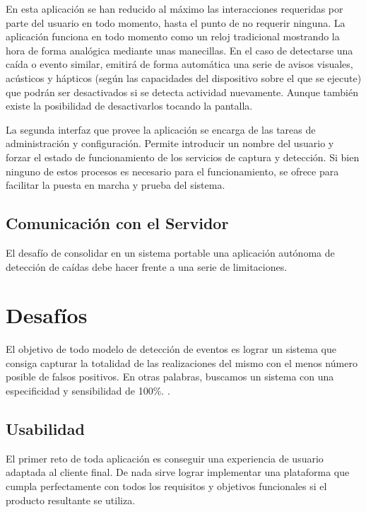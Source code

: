 En esta aplicación se han reducido al máximo las interacciones requeridas por parte del usuario en todo momento, hasta el punto de no requerir ninguna. La aplicación funciona en todo momento como un reloj tradicional mostrando la hora de forma analógica mediante unas manecillas. En el caso de detectarse una caída o evento similar, emitirá de forma automática una serie de avisos visuales, acústicos y hápticos (según las capacidades del dispositivo sobre el que se ejecute) que podrán ser desactivados si se detecta actividad nuevamente. Aunque también existe la posibilidad de desactivarlos tocando la pantalla.

La segunda interfaz que provee la aplicación se encarga de las tareas de administración y configuración. Permite introducir un nombre del usuario y forzar el estado de funcionamiento de los servicios de captura y detección. Si bien ninguno de estos procesos es necesario para el funcionamiento, se ofrece para facilitar la puesta en marcha y prueba del sistema.

\subsection{Comunicación con el Servidor}



El desafío de consolidar en un sistema portable una aplicación autónoma de detección de caídas debe hacer frente a una serie de limitaciones.

\section{Desafíos}
 El objetivo de todo modelo de detección de eventos es lograr un sistema que consiga capturar la totalidad de las realizaciones del mismo con el menos número posible de falsos positivos. En otras palabras, buscamos un sistema con una especificidad y sensibilidad de 100\%\cite{Noury2007}. .

\subsection{Usabilidad}
El primer reto de toda aplicación es conseguir una experiencia de usuario adaptada al cliente final. De nada sirve lograr implementar una plataforma que cumpla perfectamente con todos los requisitos y objetivos funcionales si el producto resultante se utiliza.

